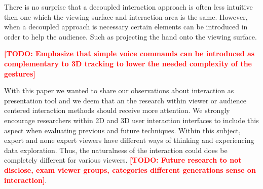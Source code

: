 \documentclass[review,journal]{vgtc}         %
\newcommand{\todo}[1]{\textbf{\textcolor{red}{[TODO: {#1}]}}}
\begin{document}
There is no surprise that a decoupled interaction approach is often less intuitive then one which the viewing surface and interaction area is the same.
However, when a decoupled approach is necessary certain elements can be introduced in order to help the audience.
Such as projecting the hand onto the viewing surface.

\todo{Emphasize that simple voice commands can be introduced as complementary to 3D tracking to lower the needed complexity of the gestures}

With this paper we wanted to share our observations about interaction as presentation tool and we deem that an the research within viewer or audience centered interaction methods should receive more attention. We strongly encourage researchers within 2D and 3D user interaction interfaces to include this aspect when evaluating previous and future techniques.
Within this subject, expert and none expert viewers have different ways of thinking and experiencing data exploration. Thus, the naturalness of the interaction could does be completely different for various viewers. \todo{Future research to not disclose, exam viewer groups, categories different generations sense on interaction}.



\end{document}
